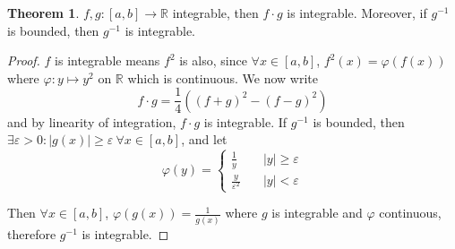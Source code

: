 \documentclass[a4paper]{article}
\theoremstyle{definition}
\newtheorem{thm}[defn]{Theorem}
\begin{document}
\begin{thm}
$f,g:[a,b] \rightarrow \mathbb R$ integrable, then $f\cdot g$ is integrable. Moreover, if $g^{-1}$ is bounded, then $g^{-1}$ is integrable.
\end{thm}
\begin{proof}
$f$ is integrable means $f^2$ is also, since $\forall x\in[a,b]$, $f^2(x)=\varphi (f(x))$ where $\varphi:y\mapsto y^2$ on $\mathbb R$ which is continuous. We now write
\[
f\cdot g=\frac14 \left( (f+g)^2-(f-g)^2 \right)
\]
and by linearity of integration, $f\cdot g$ is integrable. If $g^{-1}$ is bounded, then $\exists \varepsilon >0 : |g(x)|\geq \varepsilon \ \forall x\in [a,b]$, and let
\[
\varphi(y)=\left\{\begin{aligned}
    \frac{1}{y} \quad &|y| \geq \varepsilon \\ \frac{y}{\varepsilon ^2} \quad &|y|<\varepsilon
\end{aligned} \right.
\]
\begin{center}
\end{center}

Then $\forall x\in [a,b]$, $\varphi(g(x))=\frac{1}{g(x)}$ where $g$ is integrable and $\varphi$ continuous, therefore $g^{-1}$ is integrable.
\end{proof}
\end{document}
